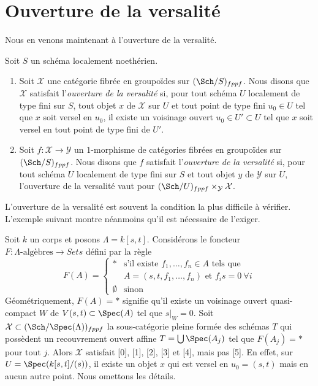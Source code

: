 \section{Ouverture de la versalité}
\label{section-openness-versality}

\noindent
Nous en venons maintenant à l'ouverture de la versalité.

\begin{definition}
\label{definition-openness-versality}
Soit $S$ un schéma localement noethérien.
\begin{enumerate}
\item Soit $\mathcal{X}$ une catégorie fibrée en groupoïdes sur
$(\Sch/S)_{fppf}$. Nous disons que $\mathcal{X}$ satisfait l'{\it ouverture
de la versalité} si, pour tout schéma $U$ localement de type fini sur $S$,
tout objet $x$ de $\mathcal{X}$ sur $U$ et tout point de type fini
$u_0 \in U$ tel que $x$ soit versel en $u_0$, il existe un voisinage ouvert
$u_0 \in U' \subset U$ tel que $x$ soit versel en tout point de type fini de
$U'$.
\item Soit $f : \mathcal{X} \to \mathcal{Y}$ un $1$-morphisme de catégories
fibrées en groupoïdes sur $(\Sch/S)_{fppf}$. Nous disons que $f$ satisfait
l'{\it ouverture de la versalité} si, pour tout schéma $U$ localement de type
fini sur $S$ et tout objet $y$ de $\mathcal{Y}$ sur $U$, l'ouverture de la
versalité vaut pour
$(\Sch/U)_{fppf} \times_\mathcal{Y} \mathcal{X}$.
\end{enumerate}
\end{definition}

\noindent
L'ouverture de la versalité est souvent la condition la plus difficile à
vérifier. L'exemple suivant montre néanmoins qu'il est nécessaire de l'exiger.

\begin{example}
\label{example-versality}
Soit $k$ un corps et posons $\Lambda = k[s, t]$. Considérons le foncteur
$F : \Lambda\text{-algèbres} \longrightarrow \textit{Sets}$
défini par la règle
$$
F(A) =
\left\{
\begin{matrix}
* & \text{s'il existe }f_1, \ldots, f_n \in A\text{ tels que } \\
  & A = (s, t, f_1, \ldots, f_n)\text{ et } f_i s = 0\ \forall i \\
\emptyset & \text{sinon}
\end{matrix}
\right.
$$
Géométriquement, $F(A) = *$ signifie qu'il existe un voisinage ouvert
quasi-compact $W$ de $V(s, t) \subset \Spec(A)$ tel que $s|_W = 0$.
Soit $\mathcal{X} \subset (\Sch/\Spec(\Lambda))_{fppf}$ la sous-catégorie
pleine formée des schémas $T$ qui possèdent un recouvrement ouvert affine
$T = \bigcup \Spec(A_j)$ tel que $F(A_j) = *$ pour tout $j$. Alors
$\mathcal{X}$ satisfait [0], [1], [2], [3] et [4], mais pas [5]. En effet,
sur $U = \Spec(k[s, t]/(s))$, il existe un objet $x$ qui est versel en
$u_0 = (s, t)$ mais en aucun autre point. Nous omettons les détails.
\end{example}

